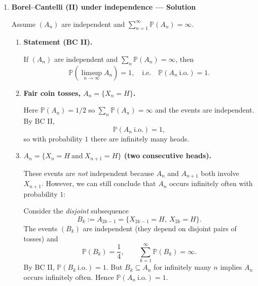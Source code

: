 \documentclass[11pt]{article}
\begin{document}
\begin{enumerate}
\begin{enumerate}[label=(\alph*)]
\item \textbf{Statement (BC I).}

\[
\mathbb{P}(\limsup_{n\to\infty}A_n)=0,
\quad\text{equivalently}\quad
\mathbb{P}(A_n\ \text{i.o.})=0.
\]

\item \textbf{Example with $\mathbb{P}(X_n=1)=1/n^2$.}

Let $A_n=\{X_n=1\}$. Then
\[
\mathbb{P}(A_n)=\frac{1}{n^2},
\qquad
\sum_{n=1}^\infty\mathbb{P}(A_n)=\sum_{n=1}^\infty\frac{1}{n^2}<\infty.
\]
By Borel--Cantelli (I),
\[
\mathbb{P}(A_n\ \text{i.o.})=\mathbb{P}(\limsup A_n)=0.
\]

\item \textbf{Interpretation.}

With probability $1$, only \emph{finitely many} indices $n$ satisfy $X_n=1$.
Equivalently, there exists a (random) $N(\omega)$ such that for all $n\ge N(\omega)$,
$X_n(\omega)=0$.
\end{enumerate}

\item \textbf{Borel--Cantelli (II) under independence — Solution}

Assume $(A_n)$ are independent and $\sum_{n=1}^\infty\mathbb{P}(A_n)=\infty$.

\begin{enumerate}[label=(\alph*)]
\item \textbf{Statement (BC II).}

If $(A_n)$ are independent and $\sum_n\mathbb{P}(A_n)=\infty$, then
\[
\mathbb{P}(\limsup_{n\to\infty}A_n)=1,
\quad\text{i.e.}\quad
\mathbb{P}(A_n\ \text{i.o.})=1.
\]

\item \textbf{Fair coin tosses, $A_n=\{X_n=H\}$.}

Here $\mathbb{P}(A_n)=1/2$ so $\sum_n\mathbb{P}(A_n)=\infty$ and the events are independent.
By BC II,
\[
\mathbb{P}(A_n\ \text{i.o.})=1,
\]
so with probability $1$ there are infinitely many heads.

\item \textbf{$A_n=\{X_n=H\ \text{and}\ X_{n+1}=H\}$ (two consecutive heads).}

These events are \emph{not} independent because $A_n$ and $A_{n+1}$ both involve $X_{n+1}$.
However, we can still conclude that $A_n$ occurs infinitely often with probability $1$:

Consider the \emph{disjoint} subsequence
\[
B_k := A_{2k-1}=\{X_{2k-1}=H,\ X_{2k}=H\}.
\]
The events $(B_k)$ are independent (they depend on disjoint pairs of tosses) and
\[
\mathbb{P}(B_k)=\frac14,
\qquad
\sum_{k=1}^\infty \mathbb{P}(B_k)=\infty.
\]
By BC II, $\mathbb{P}(B_k\ \text{i.o.})=1$.
But $B_k\subseteq A_n$ for infinitely many $n$ implies $A_n$ occurs infinitely often.
Hence $\mathbb{P}(A_n\ \text{i.o.})=1$.
\end{enumerate}


\end{enumerate}
\end{document}
